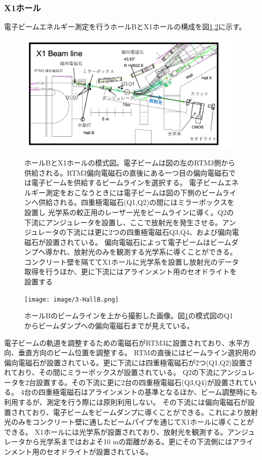 \documentclass[a4paper,11pt,uplatex]{jsbook}
\begin{document}
\subsubsection{X1ホール}
電子ビームエネルギー測定を行うホールBとX1ホールの構成を図\ref{X1},\ref{X1-2}に示す。
\begin{figure}[b]
  \centering
  \includegraphics[width=\linewidth]{image/3-X1.png}\\
  \caption[ホールBとX1ホールの模式図]{ホールBとX1ホールの模式図。電子ビームは図の左のRTM3側から供給される。RTM3偏向電磁石の直後にある一つ目の偏向電磁石では電子ビームを供給するビームラインを選択する。
  電子ビームエネルギー測定をおこなうときには電子ビームは図の下側のビームラインへ供給される。四重極電磁石(Q1,Q2)の間にはミラーボックスを設置し
  光学系の較正用のレーザー光をビームラインに導く。Q2の下流にアンジュレータを設置し、ここで放射光を発生させる。アンジュレータの下流には更に2つの四重極電磁石Q3,Q4、および偏向電磁石が設置されている。
  偏向電磁石によって電子ビームはビームダンプへ導かれ、放射光のみを観測する光学系に導くことができる。コンクリート壁を隔ててX1ホールに光学系を設置し放射光のデータ取得を行うほか、更に下流にはアラインメント用のセオドライトを設置する}
  \label{X1}
\end{figure}
\begin{figure}
  \centering
  \texttt{[image: image/3-HallB.png]}\\
  \caption[ホールBの写真]{ホールBのビームラインを上から撮影した画像。図\ref{X1}の模式図のQ1からビームダンプへの偏向電磁石までが見えている。}
  \label{X1-2}
\end{figure}
電子ビームの軌道を調整するための電磁石がRTM3に設置されており、水平方向、垂直方向のビーム位置を調整する。
RTMの直後にはビームライン選択用の偏向電磁石が設置されている。更に下流には四重極電磁石が2つ(Q1,Q2)設置されており、その間にミラーボックスが設置されている。
Q2の下流にアンジュレータを2台設置する。その下流に更に2台の四重極電磁石(Q3,Q4)が設置されている。
4台の四重極電磁石はアラインメントの基準となるほか、ビーム調整時にも利用するが、測定を行う際には原則利用しない。
その下流には偏向電磁石が設置されており、電子ビームをビームダンプに導くことができる。これにより放射光のみをコンクリート壁に通したビームパイプを通じてX1ホールに導くことができる。
X1ホールには光学系が設置されており、放射光を観測する。アンジュレータから光学系まではおよそ10 mの距離がある。更にその下流側にはアラインメント用のセオドライトが設置されている。
\end{document}
